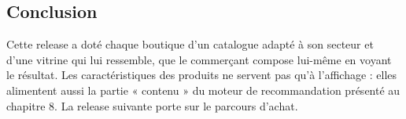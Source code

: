 \subsection*{Conclusion}
Cette release a doté chaque boutique d'un catalogue adapté à son secteur et d'une vitrine qui lui ressemble, que le commerçant compose lui-même en voyant le résultat. Les caractéristiques des produits ne servent pas qu'à l'affichage : elles alimentent aussi la partie « contenu » du moteur de recommandation présenté au chapitre 8. La release suivante porte sur le parcours d'achat.
